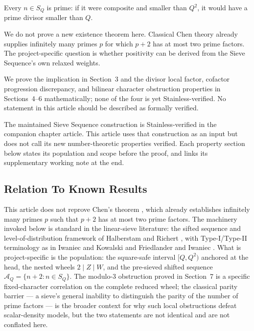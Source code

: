 Every $n\in S_Q$ is prime: if it were composite and smaller than $Q^2$, it
would have a prime divisor smaller than $Q$.

We do not prove a new existence theorem here. Classical Chen theory
already supplies infinitely many primes $p$ for which $p+2$ has at most two
prime factors. The project-specific question is whether positivity can be
derived from the Sieve Sequence's own relaxed weights.

We prove the implication in Section~3 and the divisor local factor, cofactor
progression discrepancy, and bilinear character obstruction properties in
Sections~4--6 mathematically; none of the four is yet Stainless-verified. No
statement in this article should be described as formally verified.

The maintained Sieve Sequence construction is Stainless-verified in the
companion chapter article. This article uses that construction as an input but
does not call its new number-theoretic properties verified. Each property
section below states its population and scope before the proof, and links
its supplementary working note at the end.

\subsection{Relation To Known Results}

This article does not reprove Chen's theorem \cite{chen1973}, which already
establishes infinitely many primes $p$ such that $p+2$ has at most two prime
factors. The machinery invoked below is standard in the linear-sieve
literature: the sifted sequence and level-of-distribution framework of
Halberstam and Richert \cite{halberstamrichert1974}, with Type-I/Type-II terminology as in
Iwaniec and Kowalski \cite{iwaniekowalski2004} and Friedlander and Iwaniec \cite{friedlanderiwaniec2010}.
What is project-specific is the population: the square-safe interval
$[Q,Q^2)$ anchored at the head, the nested wheels $2 \mid Z \mid W$, and the
pre-sieved shifted sequence $\mathcal A_Q=\{n+2:n\in S_Q\}$. The modulo-$3$
obstruction proved in Section~7 is a specific fixed-character correlation on the
complete reduced wheel; the classical parity barrier --- a sieve's general
inability to distinguish the parity of the number of prime factors --- is the
broader context for why such local obstructions defeat scalar-density
models, but the two statements are not identical and are not conflated here.
